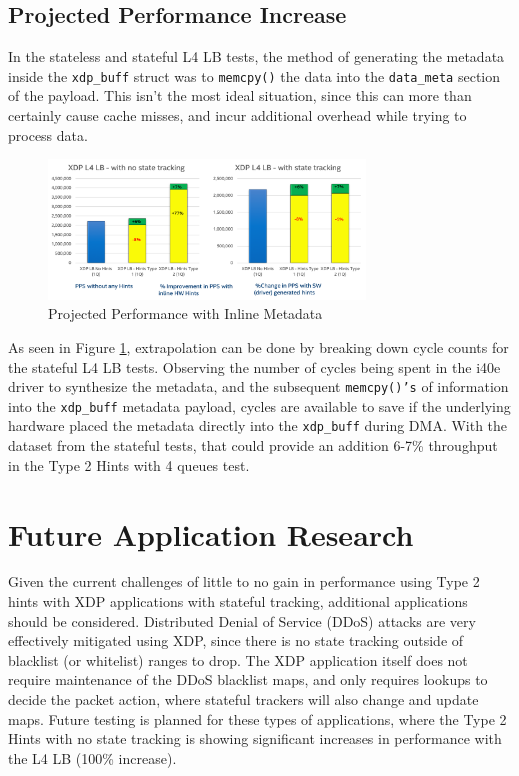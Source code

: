 \documentclass[letterpaper]{article}
\begin{document}
\subsection{Projected Performance Increase}
In the stateless and stateful L4 LB tests, the method of generating the metadata inside the {\small \texttt{xdp\_buff}} struct was to {\small \texttt{memcpy()}} the data into the {\small \texttt{data\_meta}} section of the payload.  This isn’t the most ideal situation, since this can more than certainly cause cache misses, and incur additional overhead while trying to process data.
\newline
\newline
\begin{figure}[h]
\includegraphics[width=3.31in]{xdp-projected-perf.png}
\caption{Projected Performance with Inline Metadata}
\label{xdp-projected-performance}
\end{figure}
As seen in Figure \ref{xdp-projected-performance}, extrapolation can be done by breaking down cycle counts for the stateful L4 LB tests.  Observing the number of cycles being spent in the i40e driver to synthesize the metadata, and the subsequent {\small \texttt{memcpy()’s}} of information into the {\small \texttt{xdp\_buff}} metadata payload, cycles are available to save if the underlying hardware placed the metadata directly into the {\small \texttt{xdp\_buff}} during DMA.  With the dataset from the stateful tests, that could provide an addition 6-7\% throughput in the Type 2 Hints with 4 queues test.

\section{Future Application Research}
Given the current challenges of little to no gain in performance using Type 2 hints with XDP applications with stateful tracking, additional applications should be considered.  Distributed Denial of Service (DDoS) attacks are very effectively mitigated using XDP, since there is no state tracking outside of blacklist (or whitelist) ranges to drop.  The XDP application itself does not require maintenance of the DDoS blacklist maps, and only requires lookups to decide the packet action, where stateful trackers will also change and update maps.
\newline
\newline
Future testing is planned for these types of applications, where the Type 2 Hints with no state tracking is showing significant increases in performance with the L4 LB (100\% increase).
\end{document}
